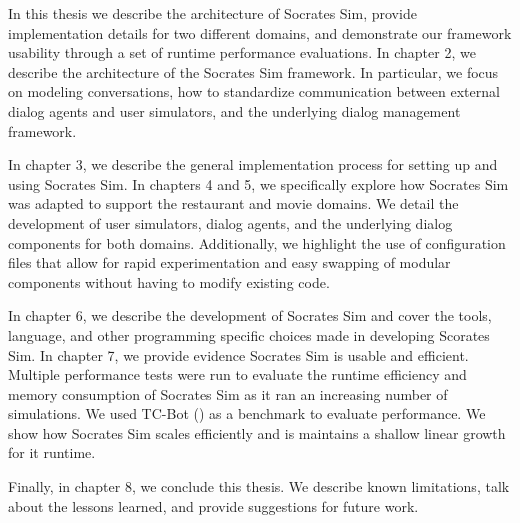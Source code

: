 In this thesis we describe the architecture of Socrates Sim, provide implementation details for two different domains, and demonstrate our framework usability through a set of runtime performance evaluations. In chapter 2, we describe the architecture of the Socrates Sim framework. In particular, we focus on modeling conversations, how to standardize communication between external dialog agents and user simulators, and the underlying dialog management framework. 

In chapter 3, we describe the general implementation process for setting up and using Socrates Sim. In chapters 4 and 5, we specifically explore how Socrates Sim was adapted to support the restaurant and movie domains. We detail the development of user simulators, dialog agents, and the underlying dialog components for both domains. Additionally, we highlight the use of configuration files that allow for rapid experimentation and easy swapping of modular components without having to modify existing code. 

In chapter 6, we describe the development of Socrates Sim and cover the tools, language, and other programming specific choices made in developing Scorates Sim. In chapter 7, we provide evidence Socrates Sim is usable and efficient. Multiple performance tests were run to evaluate the runtime efficiency and memory consumption of Socrates Sim as it ran an increasing number of simulations. We used TC-Bot (\cite{li_end_to_end}) as a benchmark to evaluate performance. We show how Socrates Sim scales efficiently and is maintains a shallow linear growth for it runtime.

Finally, in chapter 8, we conclude this thesis. We describe known limitations, talk about the lessons learned, and provide suggestions for future work.

